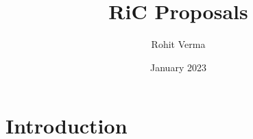 \documentclass{article}
\title{RiC Proposals}
\author{Rohit Verma}
\date{January 2023}
\begin{document}
\maketitle

\section{Introduction}
\end{document}
